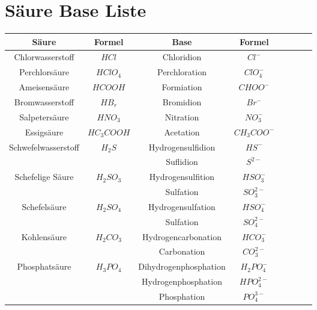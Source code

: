 \section{Säure Base Liste} \label{sec:säure_base_liste}

\begin{table}[!htbp]
    \centering
    \begin{tabular}{|Sc|Sc|Sc|Sc|}
        \hline
        \textbf{Säure} & \textbf{Formel} & \textbf{Base} & \textbf{Formel} \\
        \hline
        Chlorwasserstoff & $HCl$ & Chloridion & $Cl^-$ \\
        \hline
        Perchlorsäure & $HClO_4$ & Perchloration & $ClO_4^-$ \\
        \hline
        Ameisensäure & $HCOOH$ & Formiation & $CHOO^-$ \\
        \hline 
        Bromwasserstoff & $HB_r$ & Bromidion & $Br^-$ \\
        \hline
        Salpetersäure & $HNO_3$ & Nitration & $NO_3^-$ \\
        \hline
        Essigsäure & $HC_3COOH$ & Acetation & $CH_3COO^-$ \\
        \hline
        \hline
%

        \hline
        Schwefelwasserstoff & $H_2S$ & Hydrogensulfidion & $HS^-$ \\
        \hline
            \ & \ & Suflidion & $S^{2-}$ \\
        \hline
        Schefelige Säure & $H_2SO_3$ & Hydrogensulfition & $HSO_3^-$ \\
        \hline 
            \ & \ & Sulfation & $SO^{2-}_3$ \\
        \hline
        Schefelsäure & $H_2SO_4$ & Hydrogensulfation & $HSO^-_4$ \\
        \hline
            \ & \ & Sulfation & $SO^{2-}_4$ \\
        \hline
        Kohlensäure & $H_2CO_3$ & Hydrogencarbonation & $HCO^-_3$ \\
        \hline
            \ & \ & Carbonation & $CO^{2-}_{3}$ \\
        \hline
        \hline

%


        \hline
        Phosphatsäure & $H_3PO_4$ & Dihydrogenphosphation & $H_2PO^-_4$ \\
        \hline
            \ & \ & Hydrogenphosphation & $HPO_4^{2-}$ \\
        \hline
            \ & \ & Phosphation & $PO^{3-}_4$ \\
        \hline

    \end{tabular}
\end{table}

